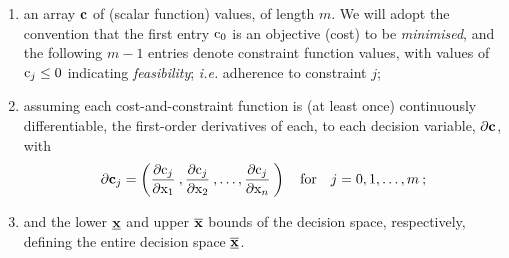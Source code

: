 \documentclass[11pt]{article}
\begin{document}
\begin{enumerate}[label=(\roman*)]
  \item an array $\mathbf{c}$ of (scalar function) values, of length $m$. We will adopt the convention that the first entry $\textrm{c}_0$ is an objective (cost) to be \emph{minimised}, and the following $m-1$ entries denote constraint function values, with values of $\textrm{c}_j \leq 0$ indicating \emph{feasibility}; \emph{i.e.} adherence to constraint $j$;
  \item assuming each cost-and-constraint function is (at least once) continuously differentiable, the first-order derivatives of each, to each decision variable, $\mathbf{\partial c}$, with
\begin{equation}
\mathbf{\partial c }_j = \left( \frac{\partial \textrm{c}_j}{\partial \textrm{x}_1 } \:,  \frac{\partial \textrm{c}_j}{\partial \textrm{x}_2} \: , \ldots,  \frac{\partial \textrm{c}_j}{\partial \textrm{x}_n} \: \right) \quad \text{for} \quad j = 0,1, \ldots, m \:;
\end{equation}
  \item and the  lower $\underline{\mathbf{x}}$ and upper $\overline{\mathbf{x}}$ bounds
 of the decision space, respectively, defining the entire decision space $\underline{\overline{\mathbf{x}}}$.
\end{enumerate}
\end{document}
